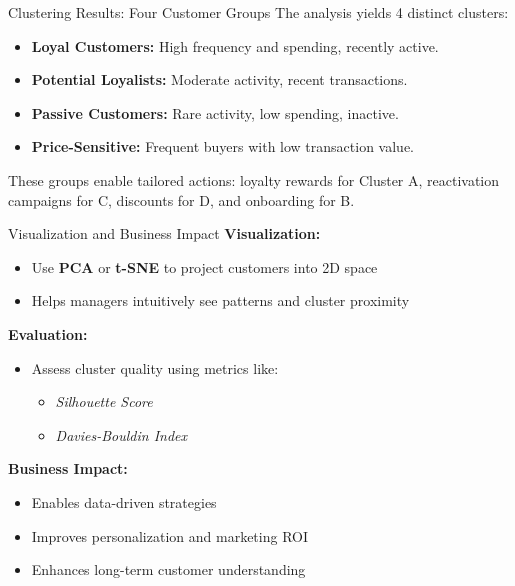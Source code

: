\documentclass[aspectratio=169, table]{beamer}
\begin{document}
\begin{frame}{Clustering Results: Four Customer Groups}
	The analysis yields 4 distinct clusters:
	
	\begin{itemize}
		\item \textbf{Loyal Customers:} High frequency and spending, recently active.
		\item \textbf{Potential Loyalists:} Moderate activity, recent transactions.
		\item \textbf{Passive Customers:} Rare activity, low spending, inactive.
		\item \textbf{Price-Sensitive:} Frequent buyers with low transaction value.
	\end{itemize}
	
	These groups enable tailored actions: loyalty rewards for Cluster A, reactivation campaigns for C, discounts for D, and onboarding for B.
\end{frame}

\begin{frame}{Visualization and Business Impact}
	\vspace{20pt}
	\textbf{Visualization:}
	\begin{itemize}
		\item Use \textbf{PCA} or \textbf{t-SNE} to project customers into 2D space
		\item Helps managers intuitively see patterns and cluster proximity
	\end{itemize}
	
	\vspace{5pt}
	\textbf{Evaluation:}
	\begin{itemize}
		\item Assess cluster quality using metrics like:
		\begin{itemize}
			\item \textit{Silhouette Score}
			\item \textit{Davies-Bouldin Index}
		\end{itemize}
	\end{itemize}
	
	\vspace{5pt}
	\textbf{Business Impact:}
	\begin{itemize}
		\item Enables data-driven strategies
		\item Improves personalization and marketing ROI
		\item Enhances long-term customer understanding
	\end{itemize}
\end{frame}
\end{document}
